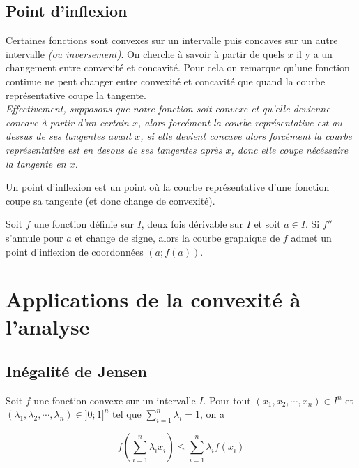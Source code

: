 \documentclass[french]{book}
\newcommand{\ie}{\leq}
\begin{document}
\subsection{Point d'inflexion}

Certaines fonctions sont convexes sur un intervalle puis concaves sur un autre intervalle \emph{(ou inversement)}. On cherche à savoir à partir de quels $x$ il y a un changement entre convexité et concavité. Pour cela on remarque qu'une fonction continue ne peut changer entre convexité et concavité que quand la courbe représentative coupe la tangente. \\

\emph{Effectivement, supposons que notre fonction soit convexe et qu'elle devienne concave à partir d'un certain $x$, alors forcément la courbe représentative est au dessus de ses tangentes avant $x$, si elle devient concave alors forcément la courbe représentative est en desous de ses tangentes  après $x$, donc elle coupe nécéssaire la tangente en $x$.}

\begin{defn}
Un point d’inflexion est un point où la courbe représentative d’une fonction coupe sa tangente (et donc change de convexité).
\end{defn}

\begin{prop}
Soit $f$ une fonction définie sur $I$, deux fois dérivable sur $I$ et soit $a \in I$.
Si $f''$ s’annule pour $a$ et change de signe, alors la courbe graphique de $f$ admet un point d’inflexion de coordonnées $(a ; f(a))$.
\end{prop}

\newpage
\section{Applications de la convexité à l'analyse}
\subsection{Inégalité de Jensen}


\begin{thm}
Soit $f$ une fonction convexe sur un intervalle $I$. Pour tout $(x_1,x_2, \cdots , x_n) \in I^n $ et $(\lambda_1,\lambda_2, \cdots , \lambda_n) \in ]0;1]^n $ tel que $\sum_{i=1}^n \lambda_i =1$, on a

$$f(\sum_{i=1}^{n} \lambda_i x_i) \ie \sum_{i=1}^n \lambda_i f(x_i)$$
\end{thm}
\end{document}
